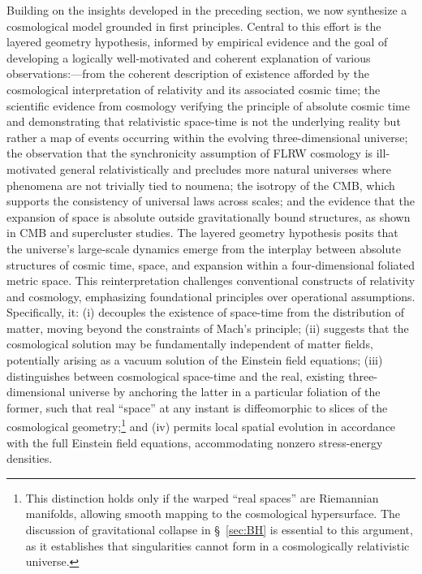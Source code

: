 \documentclass[aps,rmp,groupedaddress,twocolumn,10pt]{revtex4-2}
\begin{document}
Building on the insights developed in the preceding section, we now synthesize a cosmological model grounded in first principles. Central to this effort is the layered geometry hypothesis, informed by empirical evidence and the goal of developing a logically well-motivated and coherent explanation of various observations:---from the coherent description of existence afforded by the cosmological interpretation of relativity and its associated cosmic time; the scientific evidence from cosmology verifying the principle of absolute cosmic time and demonstrating that relativistic space-time is not the underlying reality but rather a map of events occurring within the evolving three-dimensional universe; the observation that the synchronicity assumption of FLRW cosmology is ill-motivated general relativistically and precludes more natural universes where phenomena are not trivially tied to noumena; the isotropy of the CMB, which supports the consistency of universal laws across scales; and the evidence that the expansion of space is absolute outside gravitationally bound structures, as shown in CMB and supercluster studies. The layered geometry hypothesis posits that the universe's large-scale dynamics emerge from the interplay between absolute structures of cosmic time, space, and expansion within a four-dimensional foliated metric space. This reinterpretation challenges conventional constructs of relativity and cosmology, emphasizing foundational principles over operational assumptions. Specifically, it: (i) decouples the existence of space-time from the distribution of matter, moving beyond the constraints of Mach's principle; (ii) suggests that the cosmological solution may be fundamentally independent of matter fields, potentially arising as a vacuum solution of the Einstein field equations; (iii) distinguishes between cosmological space-time and the real, existing three-dimensional universe by anchoring the latter in a particular foliation of the former, such that real ``space'' at any instant is diffeomorphic to slices of the cosmological geometry;\footnote{This distinction holds only if the warped ``real spaces'' are Riemannian manifolds, allowing smooth mapping to the cosmological hypersurface. The discussion of gravitational collapse in \S~\ref{sec:BH} is essential to this argument, as it establishes that singularities cannot form in a cosmologically relativistic universe.} and (iv) permits local spatial evolution in accordance with the full Einstein field equations, accommodating nonzero stress-energy densities.
\end{document}
